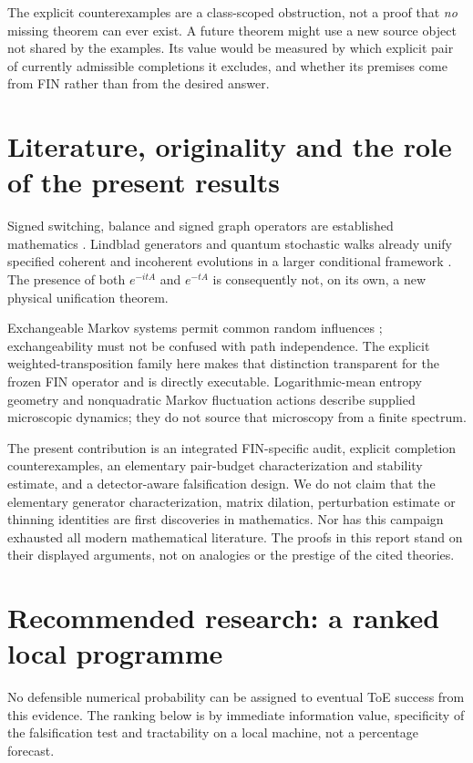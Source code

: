 \documentclass[11pt,a4paper]{article}
\begin{document}
The explicit counterexamples are a class-scoped obstruction, not a proof
that \emph{no} missing theorem can ever exist. A future theorem might use a
new source object not shared by the examples. Its value would be measured
by which explicit pair of currently admissible completions it excludes,
and whether its premises come from FIN rather than from the desired answer.

\section{Literature, originality and the role of the present results}

Signed switching, balance and signed graph operators are established
mathematics \cite{zaslavsky}. Lindblad generators and quantum stochastic
walks already unify specified coherent and incoherent evolutions in a
larger conditional framework \cite{lindblad,qsw}. The presence of both
$e^{-itA}$ and $e^{-tA}$ is consequently not, on its own, a new physical
unification theorem.

Exchangeable Markov systems permit common random influences
\cite{crane}; exchangeability must not be confused with path independence.
The explicit weighted-transposition family here makes that distinction
transparent for the frozen FIN operator and is directly executable.
Logarithmic-mean entropy geometry \cite{maas} and nonquadratic Markov
fluctuation actions \cite{mpr} describe supplied microscopic dynamics;
they do not source that microscopy from a finite spectrum.

The present contribution is an integrated FIN-specific audit, explicit
completion counterexamples, an elementary pair-budget characterization and
stability estimate, and a detector-aware falsification design. We do not
claim that the elementary generator characterization, matrix dilation,
perturbation estimate or thinning identities are first discoveries in
mathematics. Nor has this campaign exhausted all modern mathematical
literature. The proofs in this report stand on their displayed arguments,
not on analogies or the prestige of the cited theories.

\section{Recommended research: a ranked local programme}

No defensible numerical probability can be assigned to eventual ToE
success from this evidence. The ranking below is by immediate information
value, specificity of the falsification test and tractability on a local
machine, not a percentage forecast.
\end{document}

